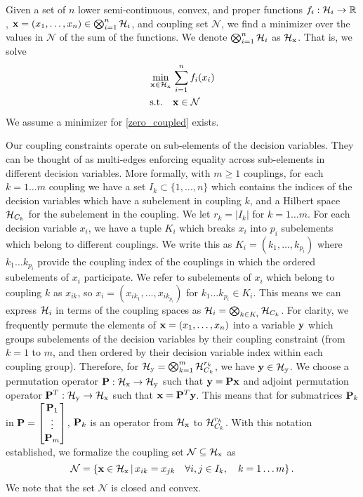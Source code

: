 Given a set of $n$ lower semi-continuous, convex, and proper functions $f_i : \mathcal{H}_i \to \mathbb R$, $\mathbf{x} = \left(x_1, \dots, x_n\right) \in \bigotimes_{i=1}^n \mathcal{H}_i$, and coupling set $\mathcal{N}$, we find a minimizer over the values in $\mathcal{N}$ of the sum of the functions.
We denote $\bigotimes_{i=1}^n \mathcal{H}_i$ as $\mathcal{H}_\text{x}$.
That is, we solve
\begin{align}
    \label{zero_coupled}
    \min_{\mathbf{x} \in \mathcal{H}_\text{x}} \, &\sum_{i=1}^n f_i(x_i) \\
    \text{s.t.} \quad &\mathbf{x} \in \mathcal{N}
\end{align}
We assume a minimizer for \eqref{zero_coupled} exists.

Our coupling constraints operate on sub-elements of the decision variables.
They can be thought of as multi-edges enforcing equality across sub-elements in different decision variables.
More formally, with $m \geq 1$ couplings, for each $k = 1 \dots m$ coupling we have a set $I_k \subset \{1, \dots, n\}$ which contains the indices of the decision variables which have a subelement in coupling $k$, and a Hilbert space $\mathcal{H}_{C_k}$ for the subelement in the coupling.
We let $r_k = |I_k|$ for $k = 1 \dots m$.
For each decision variable $x_i$, we have a tuple $K_i$ which breaks $x_i$ into $p_i$ subelements which belong to different couplings. 
We write this as $K_i = \left(k_1, \dots, k_{p_i}\right)$ where $k_1 \dots k_{p_i}$ provide the coupling index of the couplings in which the ordered subelements of $x_i$ participate.
We refer to subelements of $x_i$ which belong to coupling $k$ as $x_{ik}$, so $x_i = \left(x_{ik_1}, \dots, x_{ik_{p_i}}\right)$ for $k_1 \dots k_{p_i} \in K_i$.
This means we can express $\mathcal{H}_i$ in terms of the coupling spaces as $\mathcal{H}_i = \bigotimes_{k \in K_i} \mathcal{H}_{C_k}$.
For clarity, we frequently permute the elements of $\mathbf{x} = \left(x_1, \dots, x_n\right)$ into a variable $\mathbf{y}$ which groups subelements of the decision variables by their coupling constraint (from $k = 1$ to $m$, and then ordered by their decision variable index within each coupling group).
Therefore, for $\mathcal{H}_\text{y} = \bigotimes_{k=1}^m \mathcal{H}_{C_k}^{r_k} $, we have $\mathbf{y} \in \mathcal{H}_\text{y}$.
We choose a permutation operator $\mathbf{P} : \mathcal{H}_\text{x} \to \mathcal{H}_\text{y}$ such that $\mathbf{y} = \mathbf{P} \mathbf{x}$ and adjoint permutation operator $\mathbf{P}^T : \mathcal{H}_\text{y} \to \mathcal{H}_\text{x}$ such that $\mathbf{x} = \mathbf{P}^T\mathbf{y}$.
This means that for submatrices $\mathbf{P}_k$ in $\mathbf{P} = \begin{bmatrix}
    \mathbf{P}_1 \\
    \vdots \\
    \mathbf{P}_m 
\end{bmatrix}$, $\mathbf{P}_k$ is an operator from $\mathcal{H}_\text{x}$ to $\mathcal{H}_{C_k}^{r_k}$.
With this notation established, we formalize the coupling set $\mathcal{N} \subseteq \mathcal{H}_\text{x}$ as 
\begin{equation}\label{coupling_set_def}
    \mathcal{N} = \left\{ \mathbf{x} \in \mathcal{H}_\text{x} \, | \, x_{ik} = x_{jk} \quad \forall i,j \in I_k, \quad k = 1 \dots m\right\}.
\end{equation}
We note that the set $\mathcal{N}$ is closed and convex.

